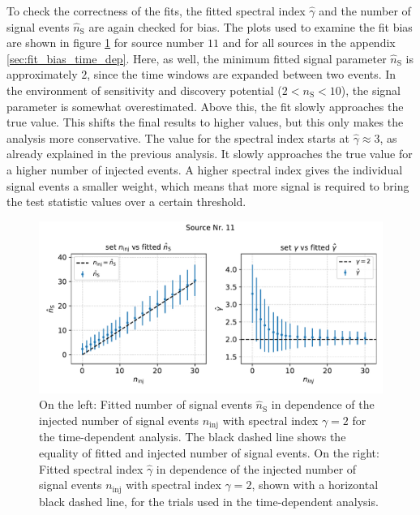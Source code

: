 To check the correctness of the fits, the fitted spectral index $\hat\gamma$ and the number of signal events $\hat{n}_\text{S}$ are again checked for bias.
The plots used to examine the fit bias are shown in figure \ref{fig:ns_gamma_fit_time_dep_1} for source number $\num{11}$ and for all sources in the appendix \ref{sec:fit_bias_time_dep}.
Here, as well, the minimum fitted signal parameter $\hat{n}_\text{S}$ is approximately $\num{2}$, since the time windows are expanded between two events.
In the environment of sensitivity and discovery potential ($2 < n_\text{S} < 10$), the signal parameter is somewhat overestimated.
Above this, the fit slowly approaches the true value.
This shifts the final results to higher values, but this only makes the analysis more conservative.
The value for the spectral index starts at $\hat\gamma \approx 3$, as already explained in the previous analysis.
It slowly approaches the true value for a higher number of injected events.
A higher spectral index gives the individual signal events a smaller weight, which means that more signal is required to bring the test statistic values over a certain threshold.
\begin{figure}
    \centering
    \includegraphics[width=\linewidth]{Plots/05_csky/ns_gamma_fit_time_dep_1.pdf}
    \caption{On the left: Fitted number of signal events $\hat{n}_{\text{S}}$ in dependence of the injected number of signal events $n_\text{inj}$ with spectral index $\gamma = 2$ for the time-dependent analysis. The black dashed line shows the equality of fitted and injected number of signal events. On the right: Fitted spectral index $\hat\gamma$ in dependence of the injected number of signal events $n_\text{inj}$ with spectral index $\gamma = 2$, shown with a horizontal black dashed line, for the trials used in the time-dependent analysis.}
    \label{fig:ns_gamma_fit_time_dep_1}
\end{figure}
